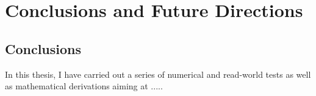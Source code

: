 \chapter{Conclusions and Future Directions}\label{chap:conclusion}
\section{Conclusions}
In this thesis, I have carried out a series of numerical and read-world tests as well as mathematical derivations aiming at .....


